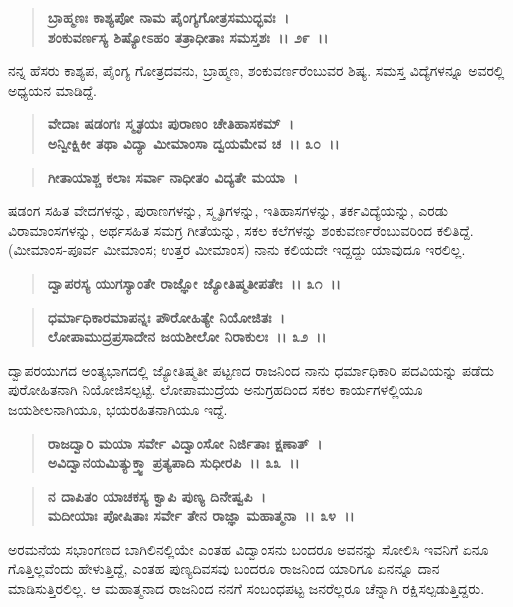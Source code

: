 \begin{verse}
\textbf{ಬ್ರಾಹ್ಮಣಃ ಕಾಶ್ಯಪೋ ನಾಮ ಪೈಂಗ್ಯಗೋತ್ರಸಮುದ್ಭವಃ~।}\\\textbf{ಶಂಕುವರ್ಣಸ್ಯ ಶಿಷ್ಯೋಽಹಂ ತತ್ರಾಧೀತಾಃ ಸಮಸ್ತಶಃ~।। ೨೯~।।}
\end{verse}

ನನ್ನ ಹೆಸರು ಕಾಶ್ಯಪ, ಪೈಂಗ್ಯ ಗೋತ್ರದವನು, ಬ್ರಾಹ್ಮಣ, ಶಂಕುವರ್ಣರೆಂಬುವರ ಶಿಷ್ಯ. ಸಮಸ್ತ ವಿದ್ಯೆಗಳನ್ನೂ ಅವರಲ್ಲಿ ಅಧ್ಯಯನ ಮಾಡಿದ್ದೆ.

\begin{verse}
\textbf{ವೇದಾಃ ಷಡಂಗಃ ಸ್ಮೃತಯಃ ಪುರಾಣಂ ಚೇತಿಹಾಸಕಮ್~।}\\\textbf{ಅನ್ವೀಕ್ಷಿಕೀ ತಥಾ ವಿದ್ಯಾ ಮೀಮಾಂಸಾ ದ್ವಯಮೇವ ಚ~।। ೩೦~।।}
\end{verse}

\begin{verse}
\textbf{ಗೀತಾಯಾಶ್ಚ ಕಲಾಃ ಸರ್ವಾ ನಾಧೀತಂ ವಿದ್ಯತೇ ಮಯಾ~।}
\end{verse}

ಷಡಂಗ ಸಹಿತ ವೇದಗಳನ್ನು, ಪುರಾಣಗಳನ್ನು, ಸ್ಮೃತಿಗಳನ್ನು, ಇತಿಹಾಸಗಳನ್ನು, ತರ್ಕವಿದ್ಯೆಯನ್ನು, ಎರಡು ವಿರಾಮಾಂಸಗಳನ್ನು, ಅರ್ಥಸಹಿತ ಸಮಗ್ರ ಗೀತೆಯನ್ನು, ಸಕಲ ಕಲೆಗಳನ್ನು ಶಂಕುವರ್ಣರೆಂಬುವರಿಂದ ಕಲಿತಿದ್ದೆ. (ಮೀಮಾಂಸ-ಪೂರ್ವ ಮೀಮಾಂಸ; ಉತ್ತರ ಮೀಮಾಂಸ) ನಾನು ಕಲಿಯದೇ ಇದ್ದದ್ದು ಯಾವುದೂ ಇರಲಿಲ್ಲ.

\begin{verse}
\textbf{ದ್ವಾಪರಸ್ಯ ಯುಗಸ್ಯಾಂತೇ ರಾಜ್ಞೋ ಜ್ಯೋತಿಷ್ಮತೀಪತೇಃ~।। ೩೧~।।}
\end{verse}

\begin{verse}
\textbf{ಧರ್ಮಾಧಿಕಾರಮಾಪನ್ನಃ ಪೌರೋಹಿತ್ಯೇ ನಿಯೋಜಿತಃ~।}\\\textbf{ಲೋಪಾಮುದ್ರಪ್ರಸಾದೇನ ಜಯಶೀಲೋ ನಿರಾಕುಲಃ~।। ೩೨~।।}
\end{verse}

ದ್ವಾಪರಯುಗದ ಅಂತ್ಯಭಾಗದಲ್ಲಿ ಜ್ಯೋತಿಷ್ಮತೀ ಪಟ್ಟಣದ ರಾಜನಿಂದ ನಾನು ಧರ್ಮಾಧಿ\-ಕಾರಿ ಪದವಿಯನ್ನು ಪಡೆದು ಪುರೋಹಿತನಾಗಿ ನಿಯೋಜಿಸಲ್ಪಟ್ಟೆ. ಲೋಪಾಮುದ್ರೆಯ ಅನುಗ್ರಹದಿಂದ ಸಕಲ ಕಾರ್ಯಗಳಲ್ಲಿಯೂ ಜಯಶೀಲನಾಗಿಯೂ, ಭಯರಹಿತನಾಗಿಯೂ ಇದ್ದೆ.

\begin{verse}
\textbf{ರಾಜದ್ವಾರಿ ಮಯಾ ಸರ್ವೇ ವಿದ್ವಾಂಸೋ ನಿರ್ಜಿತಾಃ ಕ್ಷಣಾತ್~।}\\\textbf{ಅವಿದ್ವಾನಯಮಿತ್ಯುಕ್ತ್ವಾ ಪ್ರತ್ಯಪಾದಿ ಸುಧೀರಪಿ~।। ೩೩~।। }
\end{verse}

\begin{verse}
\textbf{ನ ದಾಪಿತಂ ಯಾಚಕಸ್ಯ ಕ್ವಾಪಿ ಪುಣ್ಯ ದಿನೇಷ್ವಪಿ~।}\\\textbf{ಮದೀಯಾಃ ಪೋಷಿತಾಃ ಸರ್ವೇ ತೇನ ರಾಜ್ಞಾ ಮಹಾತ್ಮನಾ~।। ೩೪~।।}
\end{verse}

ಅರಮನೆಯ ಸಭಾಂಗಣದ ಬಾಗಿಲಿನಲ್ಲಿಯೇ ಎಂತಹ ವಿದ್ವಾಂಸನು ಬಂದರೂ ಅವನನ್ನು ಸೋಲಿಸಿ ಇವನಿಗೆ ಏನೂ ಗೊತ್ತಿಲ್ಲವೆಂದು ಹೇಳುತ್ತಿದ್ದೆ, ಎಂತಹ ಪುಣ್ಯದಿವಸವು ಬಂದರೂ ರಾಜನಿಂದ ಯಾರಿಗೂ ಏನನ್ನೂ ದಾನ ಮಾಡಿಸುತ್ತಿರಲಿಲ್ಲ. ಆ ಮಹಾತ್ಮನಾದ ರಾಜನಿಂದ ನನಗೆ ಸಂಬಂಧಪಟ್ಟ ಜನರೆಲ್ಲರೂ ಚೆನ್ನಾಗಿ ರಕ್ಷಿಸಲ್ಪಡುತ್ತಿದ್ದರು.

